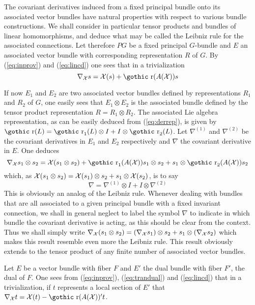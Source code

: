 \documentclass[12pt,titlepage]{article}
\def\goth#1{\hbox{\gothic #1}}
\def\cX{{\cal X}}
\def\gr{{\goth r}}
\begin{document}
The covariant derivatives induced from a fixed principal bundle onto
its associated vector bundles have natural properties
with respect to various bundle constructions.
 We shall consider in
particular tensor products and bundles of linear homomorphisms, and 
deduce what may be called the Leibniz rule for the associated connections.
 Let therefore \(PG\) be a fixed principal \(G\)-bundle and \(E\) an
associated vector bundle with corresponding representation \(R\) 
of \(G\). By (\ref{eq:inprov}) and (\ref{eq:lincd}) 
one sees that in a trivialization
\begin{equation}\label{eq:asscon}
\nabla_\cX s= \cX(s) + \gr(A (\cX))s
\end{equation}


If now \(E_1\) and
\(E_2\) are two associated vector bundles defined by representations \(R_1\)
and \(R_2\) of \(G\), one easily sees that \(E_1\otimes E_2\) is the
associated bundle defined by the tensor product representation
\(R=R_1\otimes R_2\). The associated Lie algebra representation, 
as can be easily deduced from (\ref{eq:derrep}), is given
by \(\gr(L)=\gr_1(L)\otimes I + I\otimes\gr_2(L)\). Let
\(\nabla^{(1)}\) and \(\nabla^{(2)}\) be the covariant derivatives in
\(E_1\) and \(E_2\) respectively and \(\nabla\) the covariant derivative
in \(E\). 
One deduces 
\[
\nabla_\cX s_1\otimes s_2= \cX(s_1\otimes s_2) +
\gr_1(A (\cX))s_1\otimes s_2 + s_1\otimes\gr_2(A (\cX))s_2
\]
which, as 
\(\cX(s_1\otimes s_2)=\cX(s_1)\otimes s_2+s_1\otimes \cX(s_2)\),
 is to say 
\[
\nabla = \nabla^{(1)}\otimes I +
I\otimes\nabla^{(2)}
\] 
This is obviously an analog of the Leibniz
rule. Whenever dealing with bundles that are all associated to a given
principal bundle with a fixed invariant connection, we shall in general
neglect to label the symbol \(\nabla\) to indicate in which bundle the
covariant derivative is acting, as this should be clear from the
context. Thus we shall simply write \(\nabla_\cX(s_1\otimes s_2) =
(\nabla_\cX s_1)\otimes s_2 + s_1\otimes(\nabla_\cX s_2)\) which makes
this result resemble even more the Leibniz rule. This result obviously
extends to the tensor product of any finite number of associated
vector bundles.

Let \(E\) be a vector bundle with fiber \(F\) and \(E'\) the dual bundle
with fiber \(F'\), the dual of \(F\). One sees from (\ref{eq:inprov}),
 (\ref{eq:trandual}) and (\ref{eq:lincd}) that in a  trivialization,
if \(t\) represents a local section of \(E'\) that \(\nabla_\cX t=\cX(t) -
\gr(A (\cX))'t\).
\end{document}
